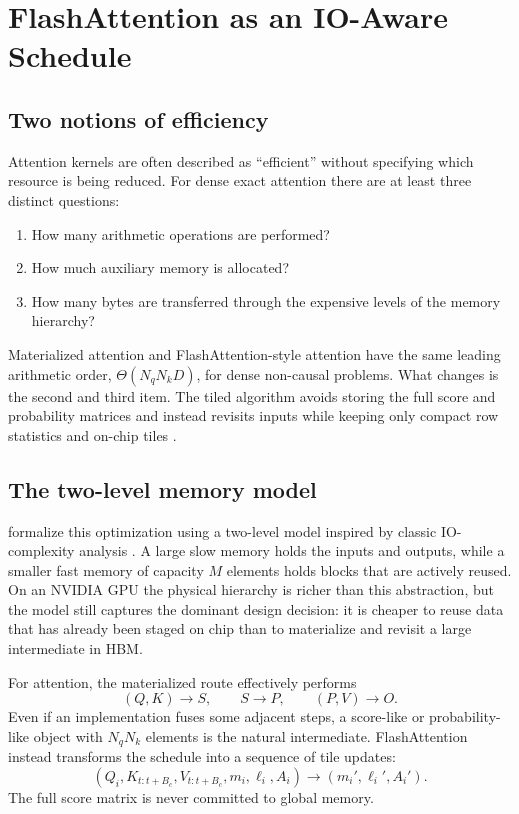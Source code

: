\chapter{FlashAttention as an IO-Aware Schedule}
\label{chap:flash}

\section{Two notions of efficiency}

Attention kernels are often described as ``efficient'' without specifying which resource is being reduced. For dense exact attention there are at least three distinct questions:
\begin{enumerate}
  \item How many arithmetic operations are performed?
  \item How much auxiliary memory is allocated?
  \item How many bytes are transferred through the expensive levels of the memory hierarchy?
\end{enumerate}
Materialized attention and FlashAttention-style attention have the same leading arithmetic order, $\Theta(N_qN_kD)$, for dense non-causal problems. What changes is the second and third item. The tiled algorithm avoids storing the full score and probability matrices and instead revisits inputs while keeping only compact row statistics and on-chip tiles \citep{dao2022flashattention,rabe2021selfattention}.

\section{The two-level memory model}

\citet{dao2022flashattention} formalize this optimization using a two-level model inspired by classic IO-complexity analysis \citep{aggarwal1988io}. A large slow memory holds the inputs and outputs, while a smaller fast memory of capacity $M$ elements holds blocks that are actively reused. On an NVIDIA GPU the physical hierarchy is richer than this abstraction, but the model still captures the dominant design decision: it is cheaper to reuse data that has already been staged on chip than to materialize and revisit a large intermediate in HBM.

For attention, the materialized route effectively performs
\begin{equation}
  (Q,K) \to S, \qquad S \to P, \qquad (P,V) \to O.
\end{equation}
Even if an implementation fuses some adjacent steps, a score-like or probability-like object with $N_qN_k$ elements is the natural intermediate. FlashAttention instead transforms the schedule into a sequence of tile updates:
\begin{equation}
  (Q_i, K_{t:t+B_c}, V_{t:t+B_c}, m_i, \ell_i, A_i)
  \longrightarrow
  (m_i', \ell_i', A_i').
\end{equation}
The full score matrix is never committed to global memory.

